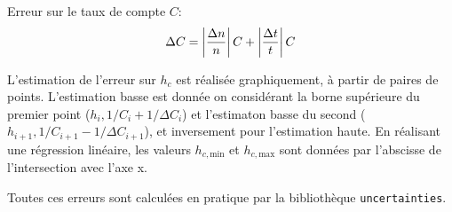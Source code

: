 Erreur sur le taux de compte \(C\):
\begin{equation}
    \Delta C = \left|\frac{\Delta n}{n}\right| C + \left|\frac{\Delta t}{t}\right| C
\end{equation}

L'estimation de l'erreur sur \(h_c\) est réalisée graphiquement, à partir de paires de points. L'estimation basse est donnée on considérant la borne supérieure du premier point (\(h_i, 1/C_i + 1/\Delta C_i\)) et l'estimaton basse du second (\(h_{i+1}, 1/C_{i+1} - 1/\Delta C_{i+1}\)), et inversement pour l'estimation haute. En réalisant une régression linéaire, les valeurs \(h_{c,\textrm{min}}\) et \(h_{c,\textrm{max}}\) sont données par l'abscisse de l'intersection avec l'axe x.

Toutes ces erreurs sont calculées en pratique par la bibliothèque \texttt{uncertainties}.
